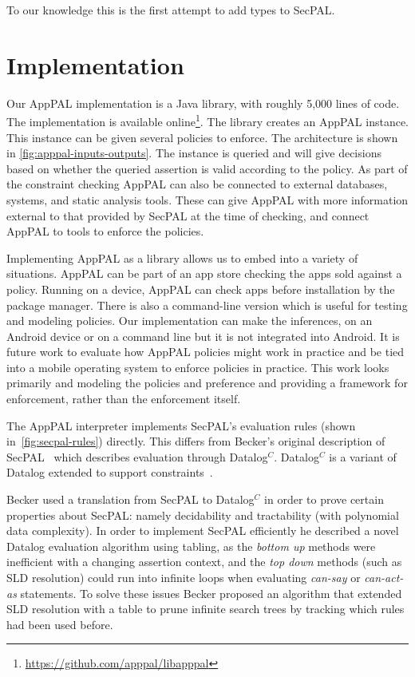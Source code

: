 \documentclass[thesis.tex]{subfiles}
\begin{document}
To our knowledge this is the first attempt to add types to SecPAL.


\section{Implementation}
\label{sec:implementation}

Our AppPAL implementation is a Java library, with roughly 5,000 lines of code.
The implementation is available
online\footnote{\url{https://github.com/apppal/libapppal}}. The library creates
an AppPAL instance. This instance can be given several policies to enforce. The
architecture is shown in \autoref{fig:apppal-inputs-outputs}. The instance is
queried and will give decisions based on whether the queried assertion is valid
according to the policy. As part of the constraint checking AppPAL can also be
connected to external databases, systems, and static analysis tools. These can
give AppPAL with more information external to that provided by SecPAL at the
time of checking, and connect AppPAL to tools to enforce the policies.

Implementing AppPAL as a library allows us to embed into a variety of
situations. AppPAL can be part of an app store checking the apps sold against a
policy. Running on a device, AppPAL can check apps before installation by the
package manager. There is also a command-line version which is useful for
testing and modeling policies. Our implementation can make the inferences, on
an Android device or on a command line but it is not integrated into Android. It
is future work to evaluate how AppPAL policies might work in practice and be
tied into a mobile operating system to enforce policies in practice. This work
looks primarily and modeling the policies and preference and providing a
framework for enforcement, rather than the enforcement itself.

The AppPAL interpreter implements SecPAL's evaluation rules (shown
in~\autoref{fig:secpal-rules}) directly. This differs from Becker's original
description of SecPAL~\cite{becker_secpal:_2006} which describes evaluation
through Datalog$^C$. Datalog$^C$ is a variant of Datalog extended to support
constraints~\cite{li_datalog_2003}. 

Becker used a translation from SecPAL to Datalog$^C$ in order to prove certain
properties about SecPAL: namely decidability and tractability (with polynomial
data complexity). In order to implement SecPAL efficiently he described a novel
Datalog evaluation algorithm using tabling, as the \emph{bottom up} methods were
inefficient with a changing assertion context, and the \emph{top down} methods
(such as SLD resolution) could run into infinite loops when evaluating
\emph{can-say} or \emph{can-act-as} statements. To solve these issues Becker
proposed an algorithm that extended SLD resolution with a table to prune
infinite search trees by tracking which rules had been used before.
\end{document}
